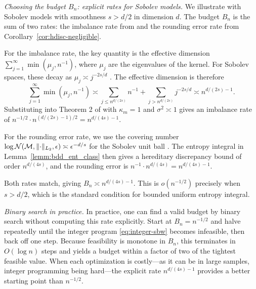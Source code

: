 \documentclass{article}
\newcommand{\paragraph}[1]{\par\noindent\textit{#1}\enspace}
\DeclarePairedDelimiter\norm{\lVert}{\rVert}
\theoremstyle{definition}
\newcommand{\model}{\mathcal{M}}
\newcommand{\<}{\langle}
\renewcommand{\>}{\rangle}
\begin{document}
\begin{refsection}
\paragraph{Choosing the budget $B_n$: explicit rates for Sobolev models.}
We illustrate with Sobolev models with smoothness $s > d/2$ in dimension $d$. The budget $B_n$ is the sum of two rates: the imbalance rate from \citet[Theorem 2]{hirshberg2019minimax} and the rounding error rate from Corollary~\ref{cor:hdisc-negligible}.

For the imbalance rate, the key quantity is the effective dimension $\sum_{j=1}^\infty \min(\mu_j, n^{-1})$, where $\mu_j$ are the eigenvalues of the kernel. For Sobolev spaces, these decay as $\mu_j \asymp j^{-2s/d}$ \citep[see, e.g.,][]{kuhn2014approximation}. The effective dimension is therefore
\[
\sum_{j=1}^\infty \min(\mu_j, n^{-1}) \asymp \sum_{j \le n^{d/(2s)}} n^{-1} + \sum_{j > n^{d/(2s)}} j^{-2s/d} \asymp n^{d/(2s) - 1}.
\]
Substituting into Theorem 2 of \citet{hirshberg2019minimax} with $\kappa_m = 1$ and $\sigma^2 \asymp 1$ gives an imbalance rate of $n^{-1/2} \cdot n^{(d/(2s) - 1)/2} = n^{d/(4s) - 1}$.

For the rounding error rate, we use the covering number $\log \mathcal{N}(\model, \norm{\cdot}_{L_2}, \epsilon) \asymp \epsilon^{-d/s}$ for the Sobolev unit ball \citep[see, e.g.,][Section 2.1]{kuhn2015approximation}. The entropy integral in Lemma~\ref{lemm:bdd_ent_class} then gives a hereditary discrepancy bound of order $n^{d/(4s)}$, and the rounding error is $n^{-1} \cdot n^{d/(4s)} = n^{d/(4s) - 1}$.

Both rates match, giving $B_n \asymp n^{d/(4s) - 1}$. This is $o(n^{-1/2})$ precisely when $s > d/2$, which is the standard condition for bounded uniform entropy integral.

\paragraph{Binary search in practice.}
In practice, one can find a valid budget by binary search without computing this rate explicitly. Start at $B_n = n^{-1/2}$ and halve repeatedly until the integer program \eqref{eq:integer-sbw} becomes infeasible, then back off one step. Because feasibility is monotone in $B_n$, this terminates in $O(\log n)$ steps and yields a budget within a factor of two of the tightest feasible value. When each optimization is costly---as it can be in large samples, integer programming being hard---the explicit rate $n^{d/(4s)-1}$ provides a better starting point than $n^{-1/2}$.


\end{refsection}
\end{document}
